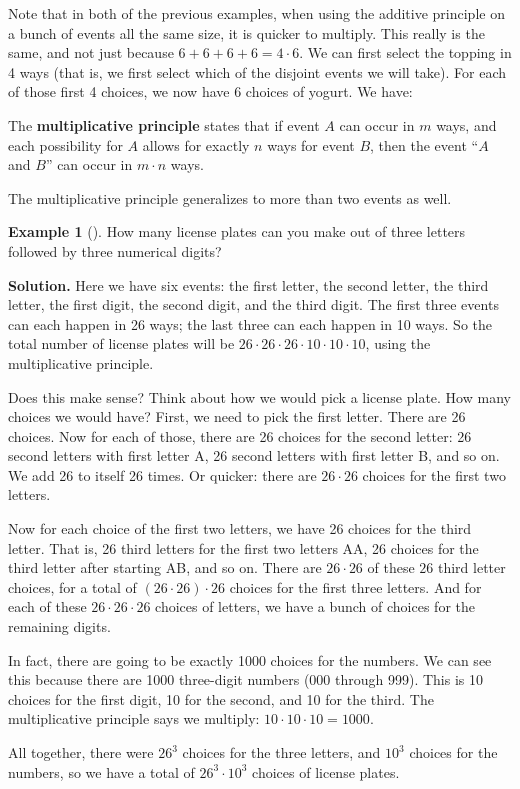 \documentclass[12pt,]{book}
\newcommand{\terminology}[1]{\textbf{#1}}
\theoremstyle{plain}
\theoremstyle{definition}
\theoremstyle{definition}
\newtheorem{example}[theorem]{Example}
\theoremstyle{definition}
\numberwithin{equation}{chapter}
\begin{document}
\hypertarget{p-714}{}%
Note that in both of the previous examples, when using the additive principle on a bunch of events all the same size, it is quicker to multiply. This really is the same, and not just because \(6 + 6 + 6 + 6 = 4\cdot 6\). We can first select the topping in 4 ways (that is, we first select which of the disjoint events we will take). For each of those first 4 choices, we now have 6 choices of yogurt. We have:%
\begin{assemblage}\label{assemblage-12}
\hypertarget{p-715}{}%
The \terminology{multiplicative principle} states that if event \(A\) can occur in \(m\) ways, and each possibility for \(A\) allows for exactly \(n\) ways for event \(B\), then the event ``\(A\) and \(B\)'' can occur in \(m \cdot n\) ways.%
\end{assemblage}
\hypertarget{p-716}{}%
The multiplicative principle generalizes to more than two events as well.%
\begin{example}[]\label{example-37}
\hypertarget{p-717}{}%
How many license plates can you make out of three letters followed by three numerical digits?%
\par\smallskip%
\noindent\textbf{Solution.}\hypertarget{solution-84}{}\quad%
\hypertarget{p-718}{}%
Here we have six events: the first letter, the second letter, the third letter, the first digit, the second digit, and the third digit. The first three events can each happen in 26 ways; the last three can each happen in 10 ways. So the total number of license plates will be \(26\cdot 26\cdot 26 \cdot 10 \cdot 10 \cdot 10\), using the multiplicative principle.%
\par
\hypertarget{p-719}{}%
Does this make sense? Think about how we would pick a license plate. How many choices we would have? First, we need to pick the first letter. There are 26 choices. Now for each of those, there are 26 choices for the second letter: 26 second letters with first letter A, 26 second letters with first letter B, and so on. We add 26 to itself 26 times. Or quicker: there are \(26 \cdot 26\) choices for the first two letters.%
\par
\hypertarget{p-720}{}%
Now for each choice of the first two letters, we have 26 choices for the third letter. That is, 26 third letters for the first two letters AA, 26 choices for the third letter after starting AB, and so on. There are \(26 \cdot 26\) of these \(26\) third letter choices, for a total of \((26\cdot26)\cdot 26\) choices for the first three letters. And for each of these \(26\cdot26\cdot26\) choices of letters, we have a bunch of choices for the remaining digits.%
\par
\hypertarget{p-721}{}%
In fact, there are going to be exactly 1000 choices for the numbers. We can see this because there are 1000 three-digit numbers (000 through 999). This is 10 choices for the first digit, 10 for the second, and 10 for the third. The multiplicative principle says we multiply: \(10\cdot 10 \cdot 10 = 1000\).%
\par
\hypertarget{p-722}{}%
All together, there were \(26^3\) choices for the three letters, and \(10^3\) choices for the numbers, so we have a total of \(26^3 \cdot 10^3\) choices of license plates.%
\end{example}
\end{document}
